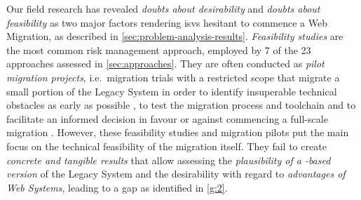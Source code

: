 Our field research  has revealed \emph{doubts about desirability} and \emph{doubts about feasibility} as two major factors rendering \glspl{isv} hesitant to commence a \gls{Web Migration}, as described in \cref{sec:problem-analysis-results}.
\emph{Feasibility studies} are the most common \gls{risk management} approach, employed by 7 of the 23 approaches assessed in \cref{sec:approaches}.
They are often conducted as \emph{pilot migration projects}, i.e.~migration trials with a restricted scope that migrate a small portion of the \gls{Legacy System} in order to identify insuperable technical obstacles as early as possible \autocite{Sneed2010SoftwareMigration}, to test the migration process and toolchain \autocite{AmazonWebServices2018Migration} and to facilitate an informed decision in favour or against commencing a full-scale migration \autocite{Sneed2010SoftwareMigration}.
However, these feasibility studies and migration pilots put the main focus on the technical feasibility of the migration itself.
They fail to create \emph{concrete and tangible results} that allow assessing the \emph{plausibility of a -based version} of the \gls{Legacy System} and the desirability with regard to \emph{advantages of \glspl{Web System}}, leading to a gap as identified in \cref{g:2}.
\vspace{-5pt}

